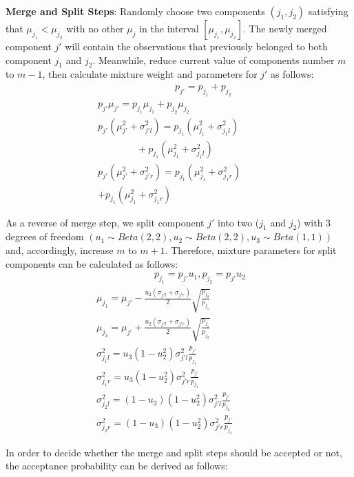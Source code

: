\documentclass[conference]{IEEEtran}
\begin{document}
\textbf{Merge and Split Steps}: Randomly choose two components $(j_1,j_2)$ satisfying that $\mu_{j_1}<\mu_{j_2}$ with no other $\mu_j$ in the interval $[\mu_{j_1},\mu_{j_2}]$. The newly merged component $j'$ will contain the observations that previously belonged to both component $j_1$ and $j_2$. Meanwhile, reduce current value of components number $m$ to $m-1$, then calculate mixture weight and parameters for $j'$ as follows:
\begin{multline}
\qquad\qquad\qquad\qquad p_{j'} = p_{j_1}+p_{j_2} \\
p_{j'}\mu_{j'} = p_{j_1}\mu_{j_1} + p_{j_2}\mu_{j_2} \\
p_{j'}(\mu_{j'}^2 + \sigma_{j'l}^2) = p_{j_1}(\mu_{j_1}^2 + \sigma_{j_1l}^2)\qquad \\
\qquad\qquad+ p_{j_1}(\mu_{j_1}^2 + \sigma_{j_1l}^2) \\
p_{j'}(\mu_{j'}^2 + \sigma_{j'r}^2) = p_{j_1}(\mu_{j_1}^2 + \sigma_{j_1r}^2)\qquad\\
+p_{j_1}(\mu_{j_1}^2 + \sigma_{j_1r}^2)\qquad\qquad
\label{eq:merge}
\end{multline}

As a reverse of merge step, we split component $j'$ into two ($j_1$ and $j_2$) with 3 degrees of freedom $(u_1 \sim Beta(2,2), u_2 \sim Beta(2,2), u_3 \sim Beta(1,1))$ and, accordingly, increase $m$ to $m+1$. Therefore, mixture parameters for split components can be calculated as follows:
\begin{multline}
\qquad\qquad\qquad p_{j_1} = p_{j'}u_1, p_{j_2} = p_{j'}u_2 \\
\mu_{j_1} = \mu_{j'} - \frac{u_2(\sigma_{j'l}+\sigma_{j'r})}{2} \sqrt{\frac{p_{j_2}}{p_{j_1}}} \\
\mu_{j_2} = \mu_{j'} + \frac{u_2(\sigma_{j'l}+\sigma_{j'r})}{2} \sqrt{\frac{p_{j_1}}{p_{j_2}}} \\
\sigma_{j_1l}^2 = u_3(1-u_2^2)\sigma_{j'l}^2\frac{p_{j'}}{p_{j_1}} \\
\sigma_{j_1r}^2 = u_3(1-u_2^2)\sigma_{j'r}^2\frac{p_{j'}}{p_{j_1}} \\
\sigma_{j_2l}^2 = (1-u_3)(1-u_2^2)\sigma_{j'l}^2\frac{p_{j'}}{p_{j_2}} \\
\sigma_{j_2r}^2 = (1-u_3)(1-u_2^2)\sigma_{j'r}^2\frac{p_{j'}}{p_{j_2}} \qquad\quad
\label{eq:split}
\end{multline}

In order to decide whether the merge and split steps should be accepted or not, the acceptance probability \cite{Richardson1997} can be derived as follows: 
\end{document}

